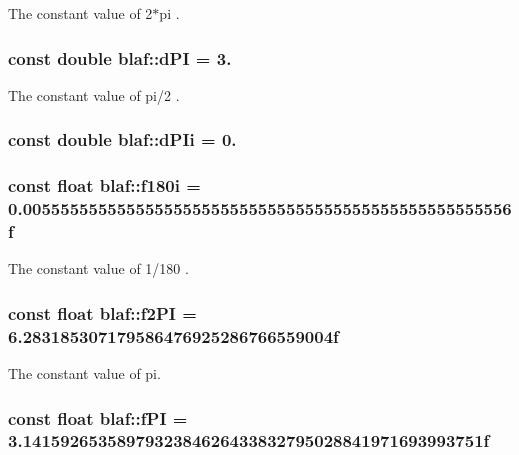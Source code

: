 \-The constant value of 2$\ast$pi . 

\hypertarget{namespaceblaf_a0f1a9f0fcfddbfaa44708b1c6d04f90d}{
\subsubsection[{d\-P\-I}]{\setlength{\rightskip}{0pt plus 5cm}const double {\bf blaf\-::d\-P\-I} = 3.}}\label{namespaceblaf_a0f1a9f0fcfddbfaa44708b1c6d04f90d}


\-The constant value of pi/2 . 

\hypertarget{namespaceblaf_a4e8539a7ba1e59181f96a61f75e0d5c4}{
\subsubsection[{d\-P\-Ii}]{\setlength{\rightskip}{0pt plus 5cm}const double {\bf blaf\-::d\-P\-Ii} = 0.}}\label{namespaceblaf_a4e8539a7ba1e59181f96a61f75e0d5c4}
\hypertarget{namespaceblaf_a270acc6912897636164a3a4e43592b56}{
\subsubsection[{f180i}]{\setlength{\rightskip}{0pt plus 5cm}const float {\bf blaf\-::f180i} = 0.\-0055555555555555555555555555555555555555555555555556f}}\label{namespaceblaf_a270acc6912897636164a3a4e43592b56}


\-The constant value of 1/180 . 

\hypertarget{namespaceblaf_a41ca3a503ed60c1cd58e835e9a2c4a24}{
\subsubsection[{f2\-P\-I}]{\setlength{\rightskip}{0pt plus 5cm}const float {\bf blaf\-::f2\-P\-I} = 6.\-283185307179586476925286766559004f}}\label{namespaceblaf_a41ca3a503ed60c1cd58e835e9a2c4a24}


\-The constant value of pi. 

\hypertarget{namespaceblaf_a5a52b16b2ea821b08e581b86b1eba264}{
\subsubsection[{f\-P\-I}]{\setlength{\rightskip}{0pt plus 5cm}const float {\bf blaf\-::f\-P\-I} = 3.\-1415926535897932384626433832795028841971693993751f}}\label{namespaceblaf_a5a52b16b2ea821b08e581b86b1eba264}


